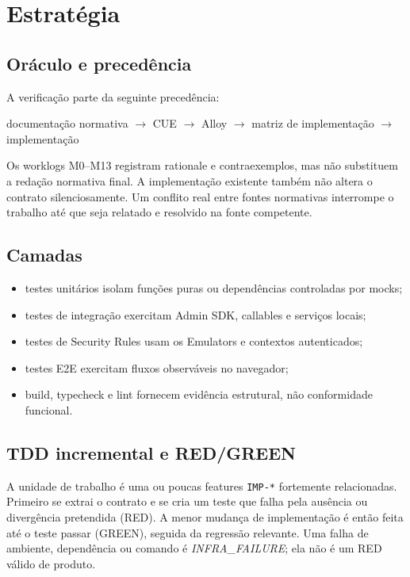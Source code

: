\section{Estratégia}

\subsection{Oráculo e precedência}

A verificação parte da seguinte precedência:

\begin{center}
documentação normativa $\rightarrow$ CUE $\rightarrow$ Alloy $\rightarrow$
matriz de implementação $\rightarrow$ implementação
\end{center}

Os worklogs M0--M13 registram rationale e contraexemplos, mas não substituem a
redação normativa final. A implementação existente também não altera o contrato
silenciosamente. Um conflito real entre fontes normativas interrompe o trabalho
até que seja relatado e resolvido na fonte competente.

\subsection{Camadas}

\begin{itemize}
  \item testes unitários isolam funções puras ou dependências controladas por mocks;
  \item testes de integração exercitam Admin SDK, callables e serviços locais;
  \item testes de Security Rules usam os Emulators e contextos autenticados;
  \item testes E2E exercitam fluxos observáveis no navegador;
  \item build, typecheck e lint fornecem evidência estrutural, não conformidade funcional.
\end{itemize}

\subsection{TDD incremental e RED/GREEN}

A unidade de trabalho é uma ou poucas features \texttt{IMP-*} fortemente
relacionadas. Primeiro se extrai o contrato e se cria um teste que falha pela
ausência ou divergência pretendida (RED). A menor mudança de implementação é
então feita até o teste passar (GREEN), seguida da regressão relevante. Uma
falha de ambiente, dependência ou comando é \emph{INFRA\_FAILURE}; ela não é um
RED válido de produto.

